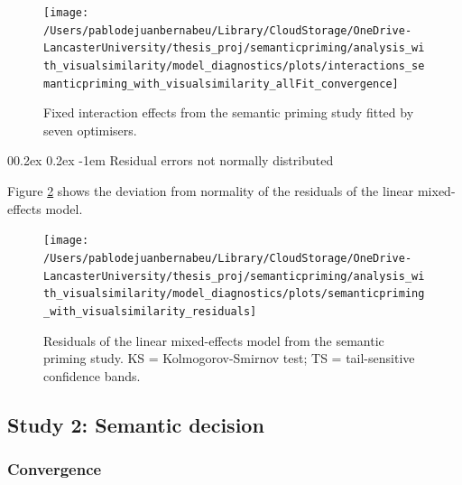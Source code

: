\documentclass[
  12pt,
  man,floatsintext]{apa7}
\makeatletter
\let\oldparagraph\paragraph
\renewcommand{\paragraph}[1]{\oldparagraph{#1}\mbox{}}
\renewcommand{\paragraph}{\@startsection{paragraph}{4}{\parindent}%
  {0\baselineskip \@plus 0.2ex \@minus 0.2ex}%
  {-1em}%
  {\normalfont\normalsize\bfseries\itshape\typesectitle}}
\makeatother
\begin{document}
\begin{figure}

{\centering \texttt{[image: /Users/pablodejuanbernabeu/Library/CloudStorage/OneDrive-LancasterUniversity/thesis\_proj/semanticpriming/analysis\_with\_visualsimilarity/model\_diagnostics/plots/interactions\_semanticpriming\_with\_visualsimilarity\_allFit\_convergence]} 

}

\caption{Fixed interaction effects from the semantic priming study fitted by seven optimisers.}\label{fig:interactions-semanticpriming-with-visualsimilarity-allFit-convergence}
\end{figure}

\hypertarget{residual-errors-not-normally-distributed-2}{%
\paragraph{Residual errors not normally distributed}\label{residual-errors-not-normally-distributed-2}}

Figure \ref{fig:semanticpriming-with-visualsimilarity-residuals} shows the deviation from normality of the residuals of the linear mixed-effects model.

\begin{figure}

{\centering \texttt{[image: /Users/pablodejuanbernabeu/Library/CloudStorage/OneDrive-LancasterUniversity/thesis\_proj/semanticpriming/analysis\_with\_visualsimilarity/model\_diagnostics/plots/semanticpriming\_with\_visualsimilarity\_residuals]} 

}

\caption{Residuals of the linear mixed-effects model from the semantic priming study. \linebreak KS = Kolmogorov-Smirnov test; TS = tail-sensitive confidence bands.}\label{fig:semanticpriming-with-visualsimilarity-residuals}
\end{figure}

\hypertarget{study-2-semantic-decision-1}{%
\subsection{Study 2: Semantic decision}\label{study-2-semantic-decision-1}}

\hypertarget{convergence-4}{%
\subsubsection{Convergence}\label{convergence-4}}
\end{document}
